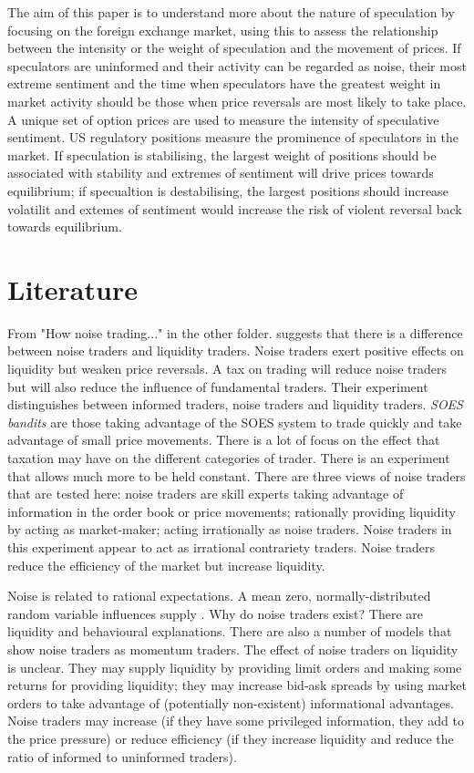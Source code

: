 \documentclass[12pt, a4paper, oneside]{article} %
\begin{document}
The aim of this paper is to understand more about the nature of speculation by focusing on the foreign exchange market, using this to assess the relationship between the intensity or the weight of speculation and the movement of prices.  If speculators are uninformed and their activity can be regarded as noise, their most extreme sentiment and the time when speculators have the greatest weight in market activity should be those when price reversals are most likely to take place.  A unique set of option prices are used to measure the intensity of speculative sentiment.  US regulatory positions measure the prominence of speculators in the market. If speculation is stabilising, the largest weight of positions should be associated with stability and extremes of sentiment will drive prices towards equilibrium; if specualtion is destabilising, the largest positions should increase volatilit and extemes of sentiment would increase the risk of violent reversal back towards equilibrium. 

\section{Literature}
From "How noise trading..." in the other folder. 
\citet{bloomfield2009noise} suggests that there is a difference between noise traders and liquidity traders.  Noise traders exert positive effects on liquidity but weaken price reversals. A tax on trading will reduce noise traders but will also reduce the influence of fundamental traders. Their experiment distinguishes between informed traders, noise traders and liquidity traders.  \emph{SOES bandits} are those taking advantage of the SOES system to trade quickly and take advantage of small price movements. There is a lot of focus on the effect that taxation may have on the different categories of trader. There is an experiment that allows much more to be held constant. There are three views of noise traders that are tested here:  noise traders are skill experts taking advantage of information in the order book or price movements;  rationally providing liquidity by acting as market-maker; acting irrationally as noise traders. Noise traders in this experiment appear to act as irrational contrariety traders. Noise traders reduce the efficiency of the market but increase liquidity. 

Noise is related to rational expectations.  A mean zero, normally-distributed random variable influences supply \citet{Muth1961Rational}.  Why do noise traders exist?  There are liquidity and behavioural explanations. There are also a number of models that show noise traders as momentum traders. The effect of noise traders on liquidity is unclear. They may supply liquidity by providing limit orders and making some returns for providing liquidity; they may increase bid-ask spreads by using market orders to take advantage of (potentially non-existent) informational advantages. Noise traders may increase (if they have some privileged information, they add to the price pressure) or reduce efficiency (if they increase liquidity and reduce the ratio of informed to uninformed traders). 
\end{document}
